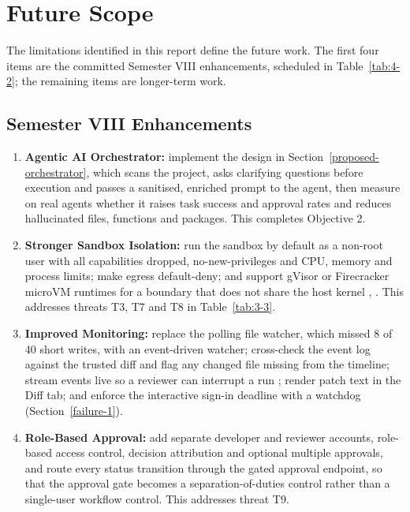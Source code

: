 \documentclass[12pt,a4paper,oneside]{report}
\providecommand{\tightlist}{\setlength{\itemsep}{0pt}\setlength{\parskip}{0pt}}
\begin{document}
\clearpage

\chapter{Future Scope}\label{future-scope}

The limitations identified in this report define the future work. The first four items are the committed Semester VIII enhancements, scheduled in Table~\ref{tab:4-2}; the remaining items are longer-term work.

\section{Semester VIII Enhancements}\label{sem8-enhancements}

\begin{enumerate}
\def\labelenumi{\arabic{enumi}.}
\tightlist
\item
  \textbf{Agentic AI Orchestrator:} implement the design in Section~\ref{proposed-orchestrator}, which scans the project, asks clarifying questions before execution and passes a sanitised, enriched prompt to the agent, then measure on real agents whether it raises task success and approval rates and reduces hallucinated files, functions and packages. This completes Objective 2.
\item
  \textbf{Stronger Sandbox Isolation:} run the sandbox by default as a non-root user with all capabilities dropped, no-new-privileges and CPU, memory and process limits; make egress default-deny; and support gVisor or Firecracker microVM runtimes for a boundary that does not share the host kernel \cite{ref12}, \cite{ref13}. This addresses threats T3, T7 and T8 in Table~\ref{tab:3-3}.
\item
  \textbf{Improved Monitoring:} replace the polling file watcher, which missed 8 of 40 short writes, with an event-driven watcher; cross-check the event log against the trusted diff and flag any changed file missing from the timeline; stream events live so a reviewer can interrupt a run \cite{ref9}; render patch text in the Diff tab; and enforce the interactive sign-in deadline with a watchdog (Section~\ref{failure-1}).
\item
  \textbf{Role-Based Approval:} add separate developer and reviewer accounts, role-based access control, decision attribution and optional multiple approvals, and route every status transition through the gated approval endpoint, so that the approval gate becomes a separation-of-duties control rather than a single-user workflow control. This addresses threat T9.
\end{enumerate}
\end{document}
